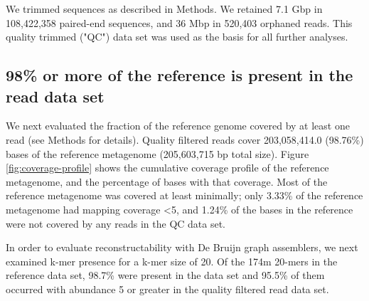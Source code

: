 \documentclass[10pt,a4paper,twocolumn]{article}
\begin{document}
We trimmed sequences as described in Methods. We retained 7.1 Gbp in
108,422,358 paired-end sequences, and 36 Mbp in 520,403 orphaned
reads.  This quality trimmed ("QC") data set was used as the basis for
all further analyses.



\subsection*{98\% or more of the reference is present in the read data set}

We next evaluated the fraction of the reference genome covered by at least
one read (see Methods for details). Quality filtered reads cover
203,058,414.0 (98.76\%) bases of the reference metagenome (205,603,715
bp total size).  Figure \ref{fig:coverage-profile} shows the
cumulative coverage profile of the reference metagenome, and the
percentage of bases with that coverage. Most of the reference
metagenome was covered at least minimally; only 3.33\% of the
reference metagenome had mapping coverage \textless 5, and 1.24\% of
the bases in the reference were not covered by any reads in the QC data
set.

In order to evaluate reconstructability with De Bruijn graph
assemblers, we next examined k-mer presence for a k-mer size of 20. Of
the 174m 20-mers in the reference data set, 98.7\% were present in the
data set and 95.5\% of them occurred with abundance 5 or greater in
the quality filtered read data set.

\end{document}
